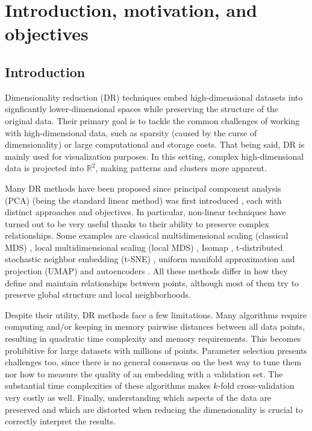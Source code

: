 \section{Introduction, motivation, and objectives}

\subsection{Introduction}

Dimensionality reduction (DR) techniques embed high-dimensional datasets into signficantly lower-dimensional spaces while preserving the structure of the original data. Their primary goal is to tackle the common challenges of working with high-dimensional data, such as sparsity (caused by the curse of dimensionality) or large computational and storage costs. That being said, DR is mainly used for visualization purposes. In this setting, complex high-dimensional data is projected into $\mathbb{R}^2$, making patterns and clusters more apparent.

Many DR methods have been proposed since principal component analysis (PCA) (being the standard linear method) was first introduced \citep{Pearson1901}, each with distinct approaches and objectives. In particular, non-linear techniques have turned out to be very useful thanks to their ability to preserve complex relationships. Some examples are classical multidimensional scaling (classical MDS) \citep{Torgerson1952, Gower1966}, local multidimensional scaling (local MDS) \citep{Chen2009}, Isomap \citep{Tenenbaum2000}, t-distributed stochastic neighbor embedding (t-SNE) \citep{Vandermaaten2008}, uniform manifold approximation and projection (UMAP) \citep{McInnes2018a} and autoencoders \citep{Baldi1989, Kramer1991}. All these methods differ in how they define and maintain relationships between points, although most of them try to preserve global structure and local neighborhoods.

Despite their utility, DR methods face a few limitations. Many algorithms require computing and/or keeping in memory pairwise distances between all data points, resulting in quadratic time complexity and memory requirements. This becomes prohibitive for large datasets with millions of points. Parameter selection presents challenges too, since there is no general consensus on the best way to tune them nor how to measure the quality of an embedding with a validation set. The substantial time complexities of these algorithms makes $k$-fold cross-validation very costly as well. Finally, understanding which aspects of the data are preserved and which are distorted when reducing the dimensionality is crucial to correctly interpret the results.

